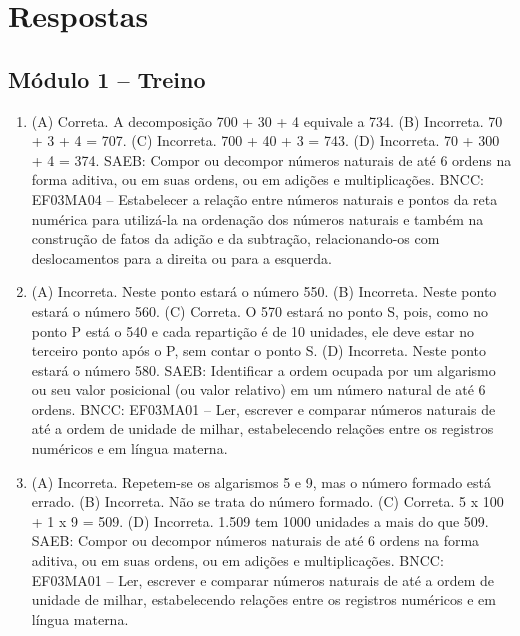 \chapter{Respostas}
\pagestyle{plain}
\footnotesize

\pagecolor{gray!40}

\section*{Módulo 1 -- Treino}

\begin{enumerate}
\item
(A) Correta. A decomposição 700 + 30 + 4 equivale a 734.
(B) Incorreta. 70 + 3 + 4 = 707.
(C) Incorreta. 700 + 40 + 3 = 743.
(D) Incorreta. 70 + 300 + 4 = 374.
SAEB: Compor ou decompor números naturais de até 6 ordens na forma aditiva, ou em suas ordens, ou em adições e multiplicações.
BNCC: EF03MA04 -- Estabelecer a relação entre números naturais e pontos da reta numérica para
utilizá-la na ordenação dos números naturais e também na construção de fatos da adição e da
subtração, relacionando-os com deslocamentos para a direita ou para a esquerda.

\item
(A) Incorreta. Neste ponto estará o número 550.
(B) Incorreta. Neste ponto estará o número 560.
(C) Correta. O 570 estará no ponto S, pois, como no ponto P está o 540 e cada
repartição é de 10 unidades, ele deve estar no terceiro ponto após o P,
sem contar o ponto S.
(D) Incorreta. Neste ponto estará o número 580.
SAEB: Identificar a ordem ocupada por um algarismo ou seu valor posicional (ou valor relativo) em um número natural de até 6 ordens.
BNCC: EF03MA01 -- Ler, escrever e comparar números naturais de até a ordem de unidade de milhar, estabelecendo relações entre os registros numéricos e em língua materna.

\item
(A) Incorreta. Repetem-se os algarismos 5 e 9, mas o número formado está errado.
(B) Incorreta. Não se trata do número formado.
(C) Correta. 5 x 100 + 1 x 9 = 509.
(D) Incorreta. 1.509 tem 1000 unidades a mais do que 509.
SAEB: Compor ou decompor números naturais de até 6 ordens na forma aditiva, ou em suas ordens, ou em adições e multiplicações.
BNCC: EF03MA01 -- Ler, escrever e comparar números naturais de até a ordem de unidade de milhar, estabelecendo relações entre os registros numéricos e em língua materna.
\end{enumerate}

